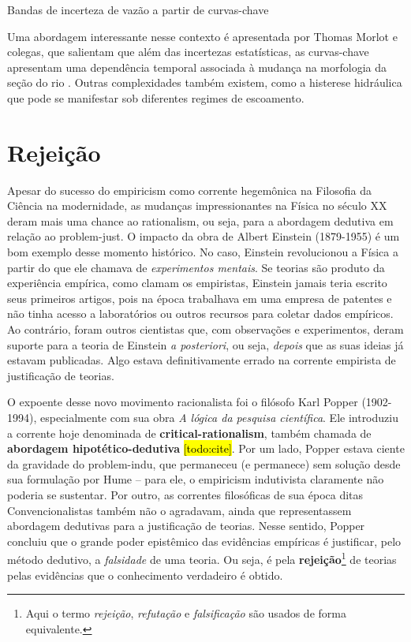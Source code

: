 \documentclass[./main.tex]{subfiles}
\begin{document}
\begin{simplebox}[
    float=htb,
    label={destaque_curvas_chave},
    nameref={Curvas-chave}
    ]{Bandas de incerteza de vazão a partir de curvas-chave}
\begin{minipage}[t]{\linewidth}
    \par Uma abordagem interessante nesse contexto é apresentada por Thomas Morlot e colegas, que salientam que além das incertezas estatísticas, as curvas-chave apresentam uma dependência temporal associada à mudança na morfologia da seção do rio \cite{Morlot2014}. Outras complexidades também existem, como a histerese hidráulica que pode se manifestar sob diferentes regimes de escoamento.    
    \end{minipage}
\label{box:rating-curve}
\normalsize
\end{simplebox}

\section{Rejeição} \label{sec:epis:popper}

\par Apesar do sucesso do \gls{empiricism} como corrente hegemônica na Filosofia da Ciência na modernidade, as mudanças impressionantes na Física no século XX deram mais uma chance ao \gls{rationalism}, ou seja, para a abordagem dedutiva em relação ao \gls{problem-just}. O impacto da obra de Albert Einstein (1879-1955) é um bom exemplo desse momento histórico. No caso, Einstein revolucionou a Física a partir do que ele chamava de \textit{experimentos mentais}. Se teorias são produto da experiência empírica, como clamam os empiristas, Einstein jamais teria escrito seus primeiros artigos, pois na época trabalhava em uma empresa de patentes e não tinha acesso a laboratórios ou outros recursos para coletar dados empíricos. Ao contrário, foram outros cientistas que, com observações e experimentos, deram suporte para a \gls{teoria} de Einstein \textit{a posteriori}, ou seja, \textit{depois} que as suas ideias já estavam publicadas. Algo estava definitivamente errado na corrente empirista de justificação de teorias.

\par O expoente desse novo movimento racionalista foi o filósofo Karl Popper (1902-1994), especialmente com sua obra \textit{A lógica da pesquisa científica}. Ele introduziu a corrente hoje denominada de \textbf{\gls{critical-rationalism}}, também chamada de \textbf{abordagem hipotético-dedutiva} \hl{[todo:cite]}. Por um lado, Popper estava ciente da gravidade do \gls{problem-indu}, que permaneceu (e permanece) sem solução desde sua formulação por Hume – para ele, o \gls{empiricism} indutivista claramente não poderia se sustentar. Por outro, as correntes filosóficas de sua época ditas Convencionalistas também não o agradavam, ainda que representassem abordagem dedutivas para a justificação de teorias. Nesse sentido, Popper concluiu que o grande poder epistêmico das evidências empíricas é justificar, pelo método dedutivo, a \textit{falsidade} de uma \gls{teoria}. Ou seja, é pela \textbf{rejeição}\footnote{Aqui o termo \textit{rejeição}, \textit{refutação} e \textit{falsificação} são usados de forma equivalente.} de teorias pelas evidências que o conhecimento verdadeiro é obtido.
\end{document}
